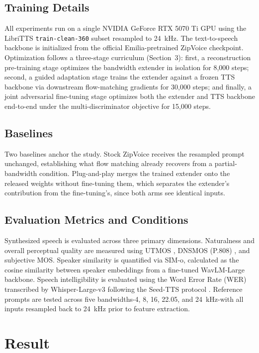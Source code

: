 \documentclass{article}
\begin{document}
\subsection{Training Details}
All experiments run on a single NVIDIA GeForce RTX 5070 Ti GPU using the LibriTTS \texttt{train-clean-360} subset resampled to 24~kHz. The text-to-speech backbone is initialized from the official Emilia-pretrained \cite{emilia} ZipVoice \cite{zipvoice} checkpoint. Optimization follows a three-stage curriculum (Section~3): first, a reconstruction pre-training stage optimizes the bandwidth extender in isolation for 8,000 steps; second, a guided adaptation stage trains the extender against a frozen TTS backbone via downstream flow-matching gradients for 30,000 steps; and finally, a joint adversarial fine-tuning stage optimizes both the extender and TTS backbone end-to-end under the multi-discriminator objective for 15,000 steps.

\subsection{Baselines}
Two baselines anchor the study. Stock ZipVoice receives the resampled prompt unchanged, establishing what flow matching already recovers from a partial-bandwidth condition. Plug-and-play merges the trained extender onto the released weights without fine-tuning them, which separates the extender's contribution from the fine-tuning's, since both arms see identical inputs.

\subsection{Evaluation Metrics and Conditions}
Synthesized speech is evaluated across three primary dimensions. Naturalness and overall perceptual quality are measured using UTMOS \cite{utmos}, DNSMOS (P.808) \cite{dnsmos}, and subjective MOS. Speaker similarity is quantified via SIM-o, calculated as the cosine similarity between speaker embeddings from a fine-tuned WavLM-Large \cite{wavlm} backbone. Speech intelligibility is evaluated using the Word Error Rate (WER) transcribed by Whisper-Large-v3 \cite{whisper} following the Seed-TTS protocol \cite{seedtts}. Reference prompts are tested across five bandwidths-4, 8, 16, 22.05, and 24~kHz-with all inputs resampled back to 24~kHz prior to feature extraction.

\section{Result}
\end{document}
